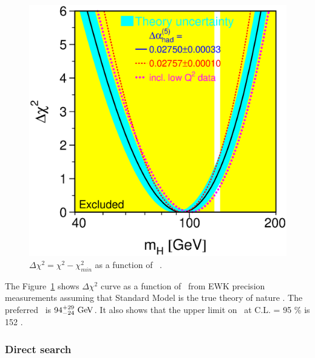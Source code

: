 \begin{figure}[t]
\centering
\includegraphics[height=0.5\textheight]{figures/w12_blueband.eps} %
\caption{$\Delta \chi^2 = \chi^2 - \chi^2_{min}$ as a function of \mHi~\cite{LEP-2}.}
\label{fig:EWKprecision}
\end{figure}
The Figure~\ref{fig:EWKprecision} 
shows $\Delta \chi^2$ curve as a function of \mHi\ from EWK precision measurements
assuming that Standard Model is the true theory of nature \cite{LEP-2}. 
The preferred \mHi\ is $94_{-24}^{+29}~\mathrm{Ge\kern -0.1em V}$. It also shows that 
the upper limit on \mHi\ at C.L. = 95 \% is 152 \GeV. 

%
\subsubsection{Direct search}  

